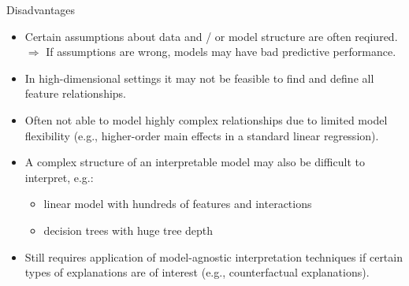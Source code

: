 \documentclass[11pt,compress,t,notes=noshow, aspectratio=169, xcolor=table]{beamer}
\begin{document}
\begin{frame}{Disadvantages}

    \begin{itemize}
    \itemsep1em
        \item Certain assumptions about data and / or model structure are often reqiured.\\
        $\Rightarrow$ If assumptions are wrong, models may have bad predictive performance.
        \item In high-dimensional settings it may not be feasible to find and define all feature relationships.
        \pause
        \item Often not able to model highly complex relationships due to limited model flexibility (e.g., higher-order main effects in a standard linear regression).
        \pause
        \item A complex structure of an interpretable model may also be difficult to interpret, e.g.:
        \begin{itemize}
            \item linear model with hundreds of features and interactions 
            \item decision trees with huge tree depth
        \end{itemize}
        \pause
        \item Still requires application of model-agnostic interpretation techniques if certain types of explanations are of interest (e.g., counterfactual explanations).
    \end{itemize}

\end{frame}
\end{document}
